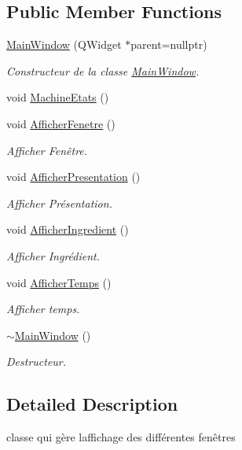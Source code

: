 \subsection*{Public Member Functions}
\begin{DoxyCompactItemize}
\item 
\hyperlink{class_main_window_a996c5a2b6f77944776856f08ec30858d}{Main\+Window} (Q\+Widget $\ast$parent=nullptr)
\begin{DoxyCompactList}\small\item\em Constructeur de la classe \hyperlink{class_main_window}{Main\+Window}. \end{DoxyCompactList}\item 
void \hyperlink{class_main_window_a59cd9a83e43405ae1ad5c18e79b04db5}{Machine\+Etats} ()
\item 
void \hyperlink{class_main_window_aad6ceb17a20cccdc88050996600e9616}{Afficher\+Fenetre} ()
\begin{DoxyCompactList}\small\item\em Afficher Fenêtre. \end{DoxyCompactList}\item 
void \hyperlink{class_main_window_aeddbbb22621e412b4749d331c1d45001}{Afficher\+Presentation} ()
\begin{DoxyCompactList}\small\item\em Afficher Présentation. \end{DoxyCompactList}\item 
void \hyperlink{class_main_window_ad4059abf16eb904f988371b3791002bf}{Afficher\+Ingredient} ()
\begin{DoxyCompactList}\small\item\em Afficher Ingrédient. \end{DoxyCompactList}\item 
void \hyperlink{class_main_window_a33811a52abf8f1ce71ec4e150d9c9ac8}{Afficher\+Temps} ()
\begin{DoxyCompactList}\small\item\em Afficher temps. \end{DoxyCompactList}\item 
\hyperlink{class_main_window_ae98d00a93bc118200eeef9f9bba1dba7}{$\sim$\+Main\+Window} ()
\begin{DoxyCompactList}\small\item\em Destructeur. \end{DoxyCompactList}\end{DoxyCompactItemize}


\subsection{Detailed Description}
classe qui gère l\textquotesingle{}affichage des différentes fenêtres 

